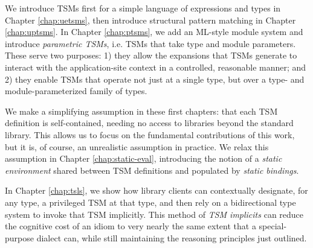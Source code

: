 We  introduce TSMs first for a simple language of expressions and types in Chapter \ref{chap:uetsms}, then introduce structural pattern matching  in Chapter \ref{chap:uptsms}. In Chapter \ref{chap:ptsms}, we add an ML-style module system and introduce \emph{parametric TSMs}, i.e. TSMs that take type and module parameters. These serve two purposes: 1) they allow the expansions that TSMs generate to interact with the application-site context in a controlled, reasonable manner; and 2) they enable TSMs that operate not just at a single type, but over a type- and module-parameterized family of types.

We make a simplifying assumption in these first chapters: that each TSM definition is self-contained, needing no access to libraries beyond the standard library. This allows us to focus on the fundamental contributions of this work, but it is, of course, an unrealistic assumption in practice. We relax this assumption in Chapter \ref{chap:static-eval}, introducing the notion of a \emph{static environment} shared between TSM definitions and populated by \emph{static bindings}.

In Chapter \ref{chap:tsls}, we show how library clients can contextually designate, for any type, a privileged TSM at that type, and then rely on a bidirectional type system to invoke that TSM implicitly. This method of \emph{TSM implicits} can reduce the cognitive cost of an idiom to very nearly the same extent that a special-purpose dialect can, while still maintaining the reasoning principles just outlined.


